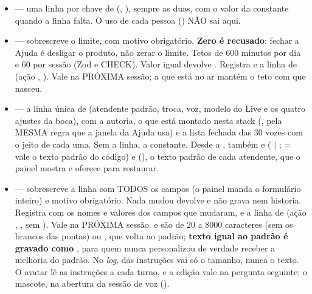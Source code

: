 \begin{itemize}
  \item {} --- uma linha por chave de
     (, ), sempre
    as duas, com o valor da constante quando a linha falta. O uso de cada pessoa
    () NÃO sai aqui.
  \item {} --- sobrescreve o
    limite, com motivo obrigatório. \textbf{Zero é recusado}: fechar a Ajuda é
    desligar o produto, não zerar o limite. Tetos de 600 minutos por dia e 60 por
    sessão (Zod e CHECK). Valor igual devolve . Registra
     e a linha de 
    (ação ,  ). Vale na
    PRÓXIMA sessão; a que está no ar mantém o teto com que nasceu.
  \item {} --- a linha única de
     (atendente padrão, troca, voz, modelo do Live e os
    quatro ajustes da boca), com a autoria, o que está montado nesta stack
    (, pela MESMA regra que a janela da Ajuda usa) e a lista
    fechada das 30 vozes com o jeito de cada uma. Sem a linha, a constante.
    Desde a , também  e
     ( $|$ ;  = vale o texto
    padrão do código) e  (), o texto padrão de cada atendente, que o painel mostra e
    oferece para restaurar.
  \item {} --- sobrescreve a linha com
    TODOS os campos (o painel manda o formulário inteiro) e motivo obrigatório.
    Nada mudou devolve  e não grava nem historia. Registra
     com os nomes e valores dos campos
    que mudaram, e a linha de  (ação
    ,  , sem
    ). Vale na PRÓXIMA sessão.  e
     são  de 20 a \num{8000} caracteres (sem
    os brancos das pontas) ou , que volta ao padrão; \textbf{texto
    igual ao padrão é gravado como }, para quem nunca personalizou de
    verdade receber a melhoria do padrão. No \emph{log}, das instruções vai só
    o tamanho, nunca o texto. O avatar lê as instruções a cada turno, e a
    edição vale na pergunta seguinte; o mascote, na abertura da sessão de voz
    ().
\end{itemize}


